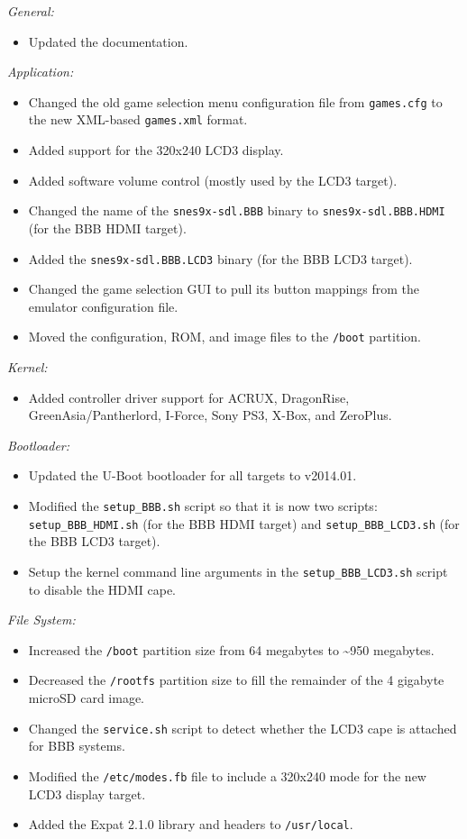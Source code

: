 
\noindent{}\emph{General:}
\begin{itemize}
\item Updated the documentation.
\end{itemize}

\noindent{}\emph{Application:}
\begin{itemize}
\item Changed the old game selection menu configuration file from \texttt{games.cfg} to the new XML-based \texttt{games.xml} format.
\item Added support for the 320x240 LCD3 display.
\item Added software volume control (mostly used by the LCD3 target).
\item Changed the name of the \texttt{snes9x-sdl.BBB} binary to \texttt{snes9x-sdl.BBB.HDMI} (for the BBB HDMI target).
\item Added the \texttt{snes9x-sdl.BBB.LCD3} binary (for the BBB LCD3 target).
\item Changed the game selection GUI to pull its button mappings from the emulator configuration file.
\item Moved the configuration, ROM, and image files to the \texttt{/boot} partition. 
\end{itemize}

\noindent{}\emph{Kernel:}
\begin{itemize}
\item Added controller driver support for ACRUX, DragonRise, GreenAsia/Pantherlord, I-Force, Sony PS3, X-Box, and ZeroPlus. 
\end{itemize}

\noindent{}\emph{Bootloader:}
\begin{itemize}
\item Updated the U-Boot bootloader for all targets to v2014.01. 
\item Modified the \texttt{setup\_BBB.sh} script so that it is now two scripts: \texttt{setup\_BBB\_HDMI.sh} (for the BBB HDMI target) and \texttt{setup\_BBB\_LCD3.sh} (for the BBB LCD3 target).
\item Setup the kernel command line arguments in the \texttt{setup\_BBB\_LCD3.sh} script to disable the HDMI cape.
\end{itemize}

\noindent{}\emph{File System:}
\begin{itemize}
\item Increased the \texttt{/boot} partition size from 64 megabytes to \textasciitilde950 megabytes.
\item Decreased the \texttt{/rootfs} partition size to fill the remainder of the 4 gigabyte microSD card image. 
\item Changed the \texttt{service.sh} script to detect whether the LCD3 cape is attached for BBB systems.
\item Modified the \texttt{/etc/modes.fb} file to include a 320x240 mode for the new LCD3 display target.
\item Added the Expat 2.1.0 library and headers to \texttt{/usr/local}.
\end{itemize}

